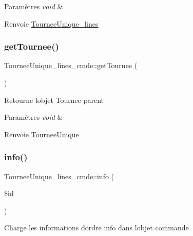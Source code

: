 \begin{DoxyParams}{Paramètres}
{\em void} & \\
\hline
\end{DoxyParams}
\begin{DoxyReturn}{Renvoie}
\hyperlink{classTourneeUnique__lines}{Tournee\+Unique\+\_\+lines} 
\end{DoxyReturn}
\mbox{\label{classTourneeUnique__lines__cmde_aabbb2e2e93c17d969aad1261531841d9}} 
\subsubsection{\texorpdfstring{get\+Tournee()}{getTournee()}}
{\footnotesize\ttfamily Tournee\+Unique\+\_\+lines\+\_\+cmde\+::get\+Tournee (\begin{DoxyParamCaption}{ }\end{DoxyParamCaption})}

Retourne l\textquotesingle{}objet Tournee parent


\begin{DoxyParams}{Paramètres}
{\em void} & \\
\hline
\end{DoxyParams}
\begin{DoxyReturn}{Renvoie}
\hyperlink{classTourneeUnique}{Tournee\+Unique} 
\end{DoxyReturn}
\mbox{\label{classTourneeUnique__lines__cmde_aa8ad4a8e54f9dfbbf513e6d9f32e2d8f}} 
\subsubsection{\texorpdfstring{info()}{info()}}
{\footnotesize\ttfamily Tournee\+Unique\+\_\+lines\+\_\+cmde\+::info (\begin{DoxyParamCaption}\item[{}]{\$id }\end{DoxyParamCaption})}

Charge les informations d\textquotesingle{}ordre info dans l\textquotesingle{}objet commande


